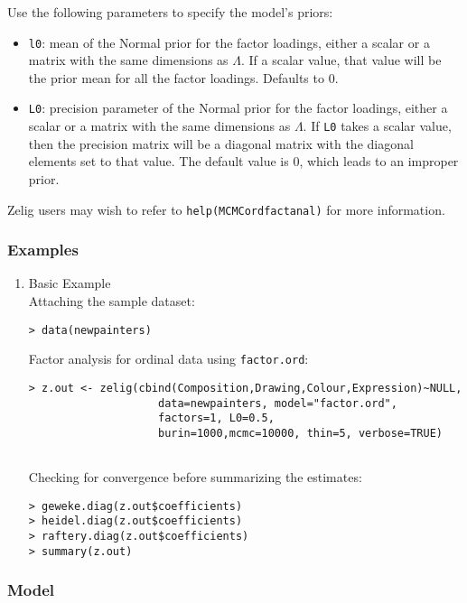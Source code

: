 Use the following parameters to specify the model's priors:  
\begin{itemize}
\item \texttt{l0}: mean of the Normal prior for the factor
loadings, either a scalar or a matrix with the same dimensions as
$\Lambda$.  If a scalar value, that value will be the prior mean for
all the factor loadings. Defaults to 0.

\item \texttt{L0}: precision parameter of the Normal prior 
for the factor loadings, either a scalar or a matrix with the same
dimensions as $\Lambda$.  If \texttt{L0} takes a scalar value, then
the precision matrix will be a diagonal matrix with the diagonal
elements set to that value. The default value is 0, which leads to an
improper prior.
\end{itemize}

Zelig users may wish to refer to \texttt{help(MCMCordfactanal)} for more 
information.



\subsubsection{Examples}

\begin{enumerate}
\item {Basic Example} \\
Attaching the sample  dataset:
\begin{verbatim}
> data(newpainters)
\end{verbatim}
Factor analysis for ordinal data using \texttt{factor.ord}:
\begin{verbatim}
> z.out <- zelig(cbind(Composition,Drawing,Colour,Expression)~NULL,
                    data=newpainters, model="factor.ord",
                    factors=1, L0=0.5,
                    burin=1000,mcmc=10000, thin=5, verbose=TRUE)
                    
\end{verbatim}
Checking for convergence before summarizing the estimates:
\begin{verbatim}
> geweke.diag(z.out$coefficients)
> heidel.diag(z.out$coefficients)
> raftery.diag(z.out$coefficients)
> summary(z.out) 
\end{verbatim} %

\end{enumerate}

\subsubsection{Model}

